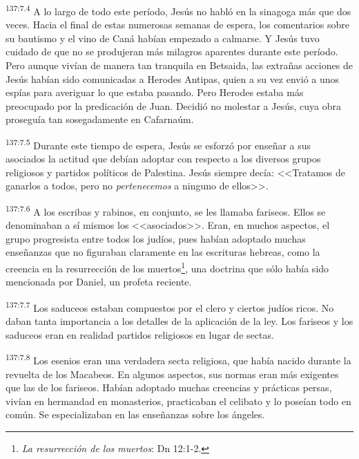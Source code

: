 \par 
\textsuperscript{137:7.4} A lo largo de todo este período, Jesús no habló en la sinagoga más que dos veces. Hacia el final de estas numerosas semanas de espera, los comentarios sobre su bautismo y el vino de Caná habían empezado a calmarse. Y Jesús tuvo cuidado de que no se produjeran más milagros aparentes durante este período. Pero aunque vivían de manera tan tranquila en Betsaida, las extrañas acciones de Jesús habían sido comunicadas a Herodes Antipas, quien a su vez envió a unos espías para averiguar lo que estaba pasando. Pero Herodes estaba más preocupado por la predicación de Juan. Decidió no molestar a Jesús, cuya obra proseguía tan sosegadamente en Cafarnaúm.

\par 
\textsuperscript{137:7.5} Durante este tiempo de espera, Jesús se esforzó por enseñar a sus asociados la actitud que debían adoptar con respecto a los diversos grupos religiosos y partidos políticos de Palestina. Jesús siempre decía: <<Tratamos de ganarlos a todos, pero no \textit{pertenecemos} a ninguno de ellos>>.

\par 
\textsuperscript{137:7.6} A los escribas y rabinos, en conjunto, se les llamaba fariseos. Ellos se denominaban a sí mismos los <<asociados>>. Eran, en muchos aspectos, el grupo progresista entre todos los judíos, pues habían adoptado muchas enseñanzas que no figuraban claramente en las escrituras hebreas, como la creencia en la resurrección de los muertos\footnote{\textit{La resurrección de los muertos}: Dn 12:1-2.}, una doctrina que sólo había sido mencionada por Daniel, un profeta reciente.

\par 
\textsuperscript{137:7.7} Los saduceos estaban compuestos por el clero y ciertos judíos ricos. No daban tanta importancia a los detalles de la aplicación de la ley. Los fariseos y los saduceos eran en realidad partidos religiosos en lugar de sectas.

\par 
\textsuperscript{137:7.8} Los esenios eran una verdadera secta religiosa, que había nacido durante la revuelta de los Macabeos. En algunos aspectos, sus normas eran más exigentes que las de los fariseos. Habían adoptado muchas creencias y prácticas persas, vivían en hermandad en monasterios, practicaban el celibato y lo poseían todo en común. Se especializaban en las enseñanzas sobre los ángeles.

